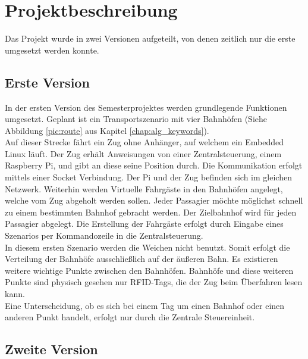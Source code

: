 \chapter{Projektbeschreibung}

Das Projekt wurde in zwei Versionen aufgeteilt, von denen zeitlich nur die erste umgesetzt werden konnte.

\section{Erste Version}

In der ersten Version des Semesterprojektes werden grundlegende Funktionen umgesetzt. Geplant ist ein Transportszenario mit vier Bahnhöfen (Siehe Abbildung \ref{pic:route} aus Kapitel \ref{chap:alg_keywords}).\\
Auf dieser Strecke fährt ein Zug ohne Anhänger, auf welchem ein Embedded Linux läuft. Der Zug erhält Anweisungen von einer Zentralsteuerung, einem Raspberry Pi, und gibt an diese seine Position durch. Die Kommunikation erfolgt mittels einer Socket Verbindung. Der Pi und der Zug befinden sich im gleichen Netzwerk. Weiterhin werden Virtuelle Fahrgäste in den Bahnhöfen angelegt, welche vom Zug abgeholt werden sollen. Jeder Passagier möchte möglichst schnell zu einem bestimmten Bahnhof gebracht werden. Der Zielbahnhof wird für jeden Passagier abgelegt. Die Erstellung der Fahrgäste erfolgt durch Eingabe eines Szenarios per Kommandozeile in die Zentralsteuerung.\\
In diesem ersten Szenario werden die Weichen nicht benutzt. Somit erfolgt die Verteilung der Bahnhöfe ausschließlich auf der äußeren Bahn. Es existieren weitere wichtige Punkte zwischen den Bahnhöfen. Bahnhöfe und diese weiteren Punkte sind physisch gesehen nur RFID-Tags, die der Zug beim Überfahren lesen kann.\\
Eine Unterscheidung, ob es sich bei einem Tag um einen Bahnhof oder einen anderen Punkt handelt, erfolgt nur durch die Zentrale Steuereinheit.

\section{Zweite Version}

